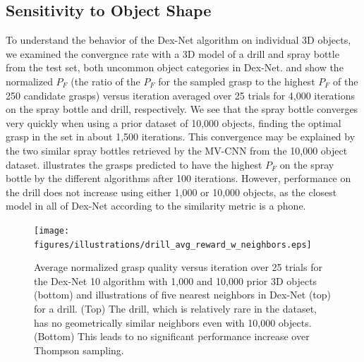 \subsection{Sensitivity to Object Shape}
To understand the behavior of the Dex-Net algorithm on individual 3D objects, we examined the convergnce rate with a 3D model of a drill and spray bottle from the test set, both uncommon object categories in Dex-Net.
 and   show the normalized $P_F$ (the ratio of the $P_F$ for the sampled grasp to the highest $P_F$ of the 250 candidate grasps) versus iteration averaged over 25 trials for 4,000 iterations on the spray bottle and drill, respectively.
We see that the spray bottle converges very quickly when using a prior dataset of 10,000 objects, finding the optimal grasp in the set in about 1,500 iterations.
This convergence may be explained by the two similar spray bottles retrieved by the MV-CNN from the 10,000 object dataset.
 illustrates the grasps predicted to have the highest $P_F$ on the spray bottle by the different algorithms after 100 iterations.
However, performance on the drill does not increase using either 1,000 or 10,000 objects, as the closest model in all of Dex-Net according to the similarity metric is a phone.

\begin{figure}[t!]
\centering
\texttt{[image: figures/illustrations/drill\_avg\_reward\_w\_neighbors.eps]}
\caption{Average normalized grasp quality versus iteration over 25 trials for the Dex-Net 10 algorithm with 1,000 and 10,000 prior 3D objects (bottom) and illustrations of five nearest neighbors in Dex-Net (top) for a drill. (Top) The drill, which is relatively rare in the dataset, has no geometrically similar neighbors even with 10,000 objects. (Bottom) This leads to no significant performance increase over Thompson sampling.}
\vspace*{-15pt}
\end{figure}

